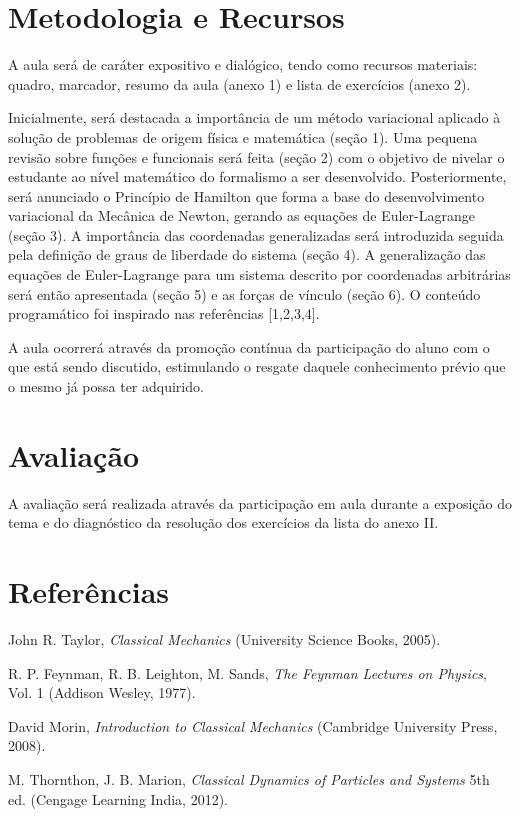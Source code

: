 \documentclass{article}
\begin{document}
\section{Metodologia e Recursos}

A aula será de caráter expositivo e dialógico, tendo como recursos materiais: quadro, marcador, resumo da aula (anexo 1) e lista de exercícios (anexo 2).

Inicialmente, será destacada a importância de um método variacional aplicado à solução de problemas de origem física e matemática (seção 1). Uma pequena revisão sobre funções e funcionais será feita (seção 2) com o objetivo de nivelar o estudante ao nível matemático do formalismo a ser desenvolvido. Posteriormente, será anunciado o Princípio de Hamilton que forma a base do desenvolvimento variacional da Mecânica de Newton, gerando as equações de Euler-Lagrange (seção 3). A importância das coordenadas generalizadas será introduzida seguida pela definição de graus de liberdade do sistema (seção 4). A generalização das equações de Euler-Lagrange para um sistema descrito por coordenadas arbitrárias será então apresentada (seção 5) e as forças de vínculo (seção 6). O conteúdo programático foi inspirado nas referências [1,2,3,4].

A aula ocorrerá através da promoção contínua da participação do aluno com o que está sendo discutido, estimulando o resgate daquele conhecimento prévio que o mesmo já possa ter adquirido.

\section{Avaliação}

A avaliação será realizada através da participação em aula durante a exposição do tema e do diagnóstico da resolução dos exercícios da lista do anexo II. 

\section{Referências}

\noindent [1] John R. Taylor, \textit{Classical Mechanics} (University Science Books, 2005).

\noindent [2] R. P. Feynman, R. B. Leighton, M. Sands, \textit{The Feynman Lectures on Physics}, Vol. 1 (Addison Wesley, 1977).

\noindent [3] David Morin, \textit{Introduction to Classical Mechanics} (Cambridge University Press, 2008).

\noindent [4] M. Thornthon, J. B. Marion, \textit{Classical Dynamics of Particles and Systems} 5th ed. (Cengage Learning India, 2012).
\end{document}
